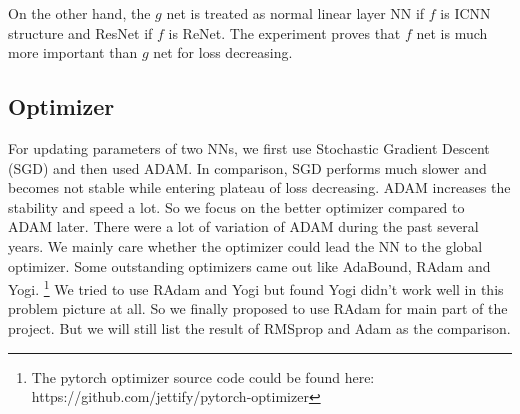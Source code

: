 \documentclass[conference,compsoc]{IEEEtran}
\begin{document}
On the other hand, the $g$ net is treated as normal linear layer NN if $f$ is ICNN structure and ResNet if $f$ is ReNet. The experiment proves that $f$ net is much more important than $g$ net for loss decreasing.

\subsection{Optimizer}
For updating parameters of two NNs, we first use Stochastic Gradient Descent (SGD) and then used ADAM. In comparison, SGD performs much slower and becomes not stable while entering plateau of loss decreasing. ADAM increases the stability and speed a lot. So we focus on the better optimizer compared to ADAM later. There were a lot of variation of ADAM during the past several years. We mainly care whether the optimizer could lead the NN to the global optimizer. Some outstanding optimizers came out like AdaBound\cite{luo2019adaptive}, RAdam\cite{liu2019variance} and Yogi\cite{zaheer2018adaptive}. \footnote{The pytorch optimizer source code could be found here: https://github.com/jettify/pytorch-optimizer}
We tried to use RAdam and Yogi but found Yogi didn't work well in this problem picture at all. So we finally proposed to use RAdam for main part of the project. But we will still list the result of RMSprop and Adam as the comparison.
\end{document}
